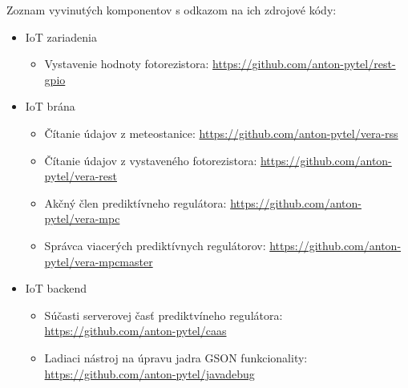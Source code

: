 Zoznam vyvinutých komponentov s odkazom na ich zdrojové kódy:
\begin{itemize}
\item IoT zariadenia
  \begin{itemize}
    \item Vystavenie hodnoty fotorezistora: \url{https://github.com/anton-pytel/rest-gpio}
  \end{itemize}
\item IoT brána
  \begin{itemize}
    \item Čítanie údajov z meteostanice: \url{https://github.com/anton-pytel/vera-rss}
    \item Čítanie údajov z vystaveného fotorezistora: \url{https://github.com/anton-pytel/vera-rest}
    \item Akčný člen prediktívneho regulátora: \url{https://github.com/anton-pytel/vera-mpc}
    \item Správca viacerých prediktívnych regulátorov: \url{https://github.com/anton-pytel/vera-mpcmaster}
  \end{itemize}   
\item IoT backend
  \begin{itemize}
    \item Súčasti serverovej časť prediktvíneho regulátora: \url{https://github.com/anton-pytel/caas}
    \item Ladiaci nástroj na úpravu jadra GSON funkcionality: \url{https://github.com/anton-pytel/javadebug}
  \end{itemize}
\end{itemize}
